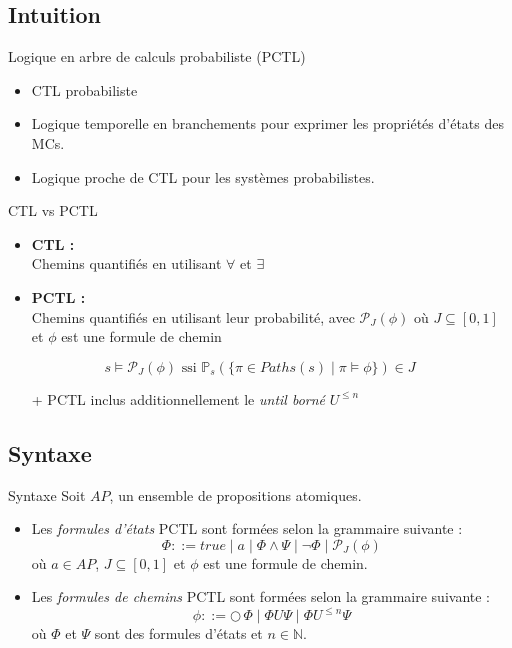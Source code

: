 \documentclass[compress]{beamer}
\begin{document}
\subsection{Intuition}
\begin{frame}{Logique en arbre de calculs probabiliste (PCTL)}
  \begin{itemize}
    \item CTL probabiliste
    \item Logique temporelle en branchements pour exprimer les {\color{fibeamer@orange}propriétés d'états} des MCs.
    \item Logique proche de CTL pour les systèmes probabilistes.
  \end{itemize}
\end{frame}

\begin{frame}{CTL vs PCTL}
\begin{itemize}
  \item \textbf{\color{fibeamer@orange}CTL :} \\
  Chemins quantifiés en utilisant $\forall$ et $\exists$
  \item \textbf{\color{fibeamer@orange}PCTL :} \\
  Chemins quantifiés en utilisant leur probabilité, avec $\mathcal{P}_J(\phi)$ où $J \subseteq [0, 1]$ et $\phi$ est une formule de chemin
\end{itemize}
\[ s \models \mathcal{P}_J(\phi) \text{ ssi } \mathbb{P}_s(\{\pi \in Paths(s) \; | \; \pi \models \phi \}) \in J\]
  \begin{itemize}
    \item[+] PCTL inclus additionnellement le \textit{until borné} $U^{\leq n}$
  \end{itemize}
\end{frame}

\subsection{Syntaxe}
\begin{frame}{}
  \begin{block}{Syntaxe}
    Soit $AP$, un ensemble de propositions atomiques.
    \begin{itemize}
      \item Les \textit{\color{fibeamer@orange}formules d'états} PCTL sont formées selon la
    grammaire suivante :
    \[
      \Phi ::= true \; | \; a \; | \; \Phi \wedge \Psi \; | \; \neg \Phi \; | \; \mathcal{P}_J(\phi)
    \]
    où $a \in AP$, $J \subseteq [0, 1]$ et $\phi$ est une formule de chemin.
      \item Les \textit{\color{fibeamer@orange}formules de chemins} PCTL sont formées selon la grammaire suivante :
      \[
        \phi ::= \bigcirc\,\Phi \; | \; \Phi U \Psi \; | \; \Phi U^{\leq n} \Psi
      \]
      où $\Phi$ et $\Psi$ sont des formules d'états et $n \in \mathbb{N}$.
    \end{itemize}
  \end{block}
\end{frame}
\end{document}
